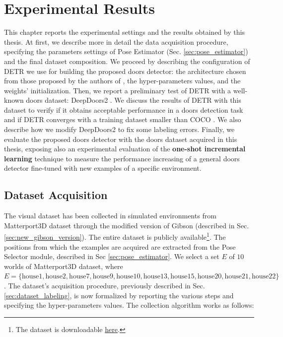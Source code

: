 \chapter{Experimental Results}
\label{sec:chapter5}
\thispagestyle{empty}

This chapter reports the experimental settings and the results obtained by this thesis. At first, we describe more in detail the data acquisition procedure, specifying the parameters settings of Pose Estimator (Sec. \ref{sec:pose_estimator}) and the final dataset composition. We proceed by describing the configuration of DETR we use for building the proposed doors detector: the architecture chosen from those proposed by the authors of \cite{detr}, the hyper-parameters values, and the weights' initialization. Then, we report a preliminary test of DETR with a well-known doors dataset: DeepDoors2 \cite{deepdoors2}. We discuss the results of DETR with this dataset to verify if it obtains acceptable performance in a doors detection task and if DETR converges with a training dataset smaller than COCO \cite{COCO}. We also describe how we modify DeepDoors2  to fix some labeling errors. Finally, we evaluate the proposed doors detector with the doors dataset acquired in this thesis, exposing also an experimental evaluation of the \textbf{one-shot incremental learning} technique to measure the performance increasing of a general doors detector fine-tuned with new examples of a specific environment. 

\section{Dataset Acquisition}
\label{sec:dataset_acquisition}
The visual dataset has been collected in simulated environments from Matterport3D dataset \cite{matterport} through the modified version of Gibson \cite{gibson} (described in Sec. \ref{sec:new_gibson_version}). The entire dataset is publicly available\footnote{The dataset is downloadable \href{https://drive.google.com/file/d/1BqjBpobjKTomFjDkzhWjmCryAXOEluO2/view?usp=sharing}{here}.}. The positions from which the examples are acquired are extracted from the Pose Selector module, described in Sec \ref{sec:pose_estimator}. We select a set $E$ of $10$ worlds of Matterport3D dataset, where $E = \{\text{house1}, \text{house2}, \text{house7}, \text{house9}, \text{house10}, \text{house13}, \text{house15}, \text{house20},  \text{house21},  \text{house22}\}$. The dataset's acquisition procedure, previously described in Sec. \ref{sec:dataset_labeling}, is now formalized by reporting the various steps and specifying the hyper-parameters values. The collection algorithm works as follows:

